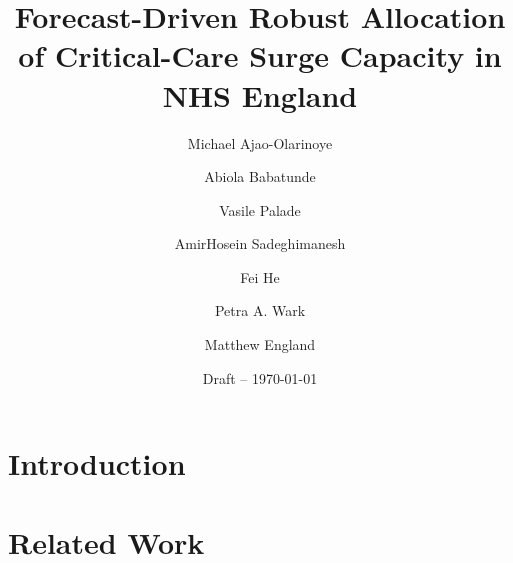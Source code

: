 \documentclass[11pt]{article}
\title{Forecast-Driven Robust Allocation of Critical-Care Surge Capacity
       in NHS England}
\author{Michael Ajao-Olarinoye \and Abiola Babatunde \and Vasile Palade \and
        AmirHosein Sadeghimanesh \and Fei He \and Petra A. Wark \and
        Matthew England}
\date{Draft -- \today}
\begin{document}
\maketitle

\begin{abstract}
\end{abstract}

\section{Introduction}\label{sec:intro}

\section{Related Work}\label{sec:related}

\end{document}
